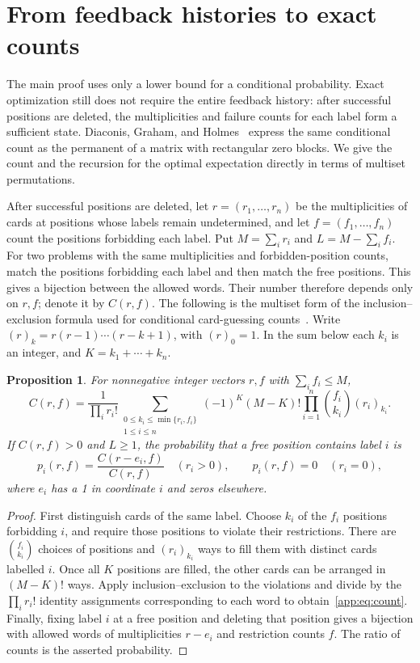 \documentclass[11pt,reqno]{amsart}
\numberwithin{equation}{section}
\newtheorem{proposition}[theorem]{Proposition}
\theoremstyle{remark}
\theoremstyle{definition}
\begin{document}
\section{From feedback histories to exact counts}\label{app:counts}
The main proof uses only a lower bound for a conditional probability. Exact optimization still does not require the entire feedback history: after successful positions are deleted, the multiplicities and failure counts for each label form a sufficient state. Diaconis, Graham, and Holmes~\cite[Section~4]{DGH} express the same conditional count as the permanent of a matrix with rectangular zero blocks. We give the count and the recursion for the optimal expectation directly in terms of multiset permutations.

After successful positions are deleted, let $r=(r_1,\ldots,r_n)$ be the multiplicities of cards at positions whose labels remain undetermined, and let $f=(f_1,\ldots,f_n)$ count the positions forbidding each label. Put $M=\sum_i r_i$ and $L=M-\sum_i f_i$. For two problems with the same multiplicities and forbidden-position counts, match the positions forbidding each label and then match the free positions. This gives a bijection between the allowed words. Their number therefore depends only on $r,f$; denote it by $C(r,f)$. The following is the multiset form of the inclusion--exclusion formula used for conditional card-guessing counts~\cite[Theorem~2 and equations~(8), (9)]{CDGM}. Write $(r)_k=r(r-1)\cdots(r-k+1)$, with $(r)_0=1$. In the sum below each $k_i$ is an integer, and $K=k_1+\cdots+k_n$.
\begin{proposition}
For nonnegative integer vectors $r,f$ with $\sum_i f_i\le M$,
\begin{equation}\label{app:eq:count}
 C(r,f)=\frac1{\prod_i r_i!}
 \sum_{\substack{0\le k_i\le\min\{r_i,f_i\}\\1\le i\le n}}
 (-1)^K(M-K)!\prod_{i=1}^n\binom{f_i}{k_i}(r_i)_{k_i}.
\end{equation}
If $C(r,f)>0$ and $L\ge1$, the probability that a free position contains label $i$ is
\[
 p_i(r,f)=\frac{C(r-e_i,f)}{C(r,f)}\quad(r_i>0),
 \qquad p_i(r,f)=0\quad(r_i=0),
\]
where $e_i$ has a 1 in coordinate $i$ and zeros elsewhere.
\end{proposition}
\begin{proof}
First distinguish cards of the same label. Choose $k_i$ of the $f_i$ positions forbidding $i$, and require those positions to violate their restrictions. There are $\binom{f_i}{k_i}$ choices of positions and $(r_i)_{k_i}$ ways to fill them with distinct cards labelled $i$. Once all $K$ positions are filled, the other cards can be arranged in $(M-K)!$ ways. Apply inclusion--exclusion to the violations and divide by the $\prod_i r_i!$ identity assignments corresponding to each word to obtain~\eqref{app:eq:count}. Finally, fixing label $i$ at a free position and deleting that position gives a bijection with allowed words of multiplicities $r-e_i$ and restriction counts $f$. The ratio of counts is the asserted probability.
\end{proof}
\end{document}

